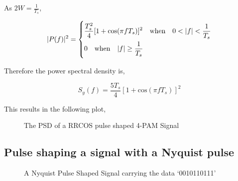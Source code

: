 As $2W = \frac{1}{T_s}$,

\begin{equation}
    \label{eqn-pf2-nyquist-ts}
    |P(f)|^2 =
    \begin{dcases}
        \frac{T_s^2}{4}[1+\textrm{cos}(\pi f T_s)]^2 \quad \textrm{when} \quad 0<|f|<\frac{1}{T_s} \\
        0 \quad \textrm{when} \quad |f| \geq \frac{1}{T_s}
    \end{dcases}
\end{equation}

Therefore the power spectral density is,

\begin{equation}
    \label{eqn:psd-nyquist}
    S_y(f) = \frac{5T_s}{4}[1+\textrm{cos}(\pi f T_s)]^2
\end{equation}

This results in the following plot,

\begin{figure}[h]
    \begin{center}
        
        \caption{The PSD of a RRCOS pulse shaped 4-PAM Signal}
    \end{center}
\end{figure}

\subsection{Pulse shaping a signal with a Nyquist pulse}

\begin{figure}[h]
    \begin{center}
        
    \end{center}
    \caption{A Nyquist Pulse Shaped Signal carrying the data `0010110111'}
\end{figure}


    
